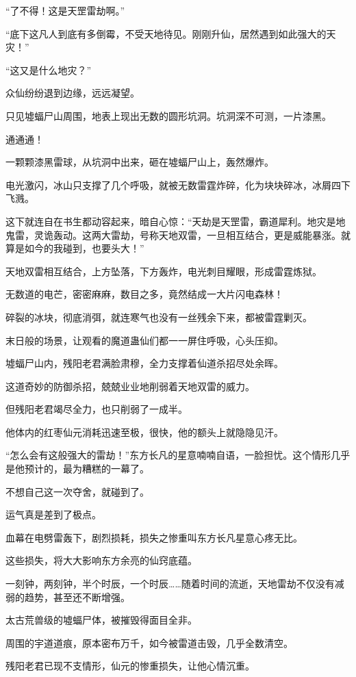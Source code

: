 \begin{this_body}
“了不得！这是天罡雷劫啊。”

“底下这凡人到底有多倒霉，不受天地待见。刚刚升仙，居然遇到如此强大的天灾！”

“这又是什么地灾？”

众仙纷纷退到边缘，远远凝望。

只见墟蝠尸山周围，地表上现出无数的圆形坑洞。坑洞深不可测，一片漆黑。

通通通！

一颗颗漆黑雷球，从坑洞中出来，砸在墟蝠尸山上，轰然爆炸。

电光激闪，冰山只支撑了几个呼吸，就被无数雷霆炸碎，化为块块碎冰，冰屑四下飞溅。

这下就连自在书生都动容起来，暗自心惊：“天劫是天罡雷，霸道犀利。地灾是地鬼雷，灵诡轰动。这两大雷劫，号称天地双雷，一旦相互结合，更是威能暴涨。就算是如今的我碰到，也要头大！”

天地双雷相互结合，上方坠落，下方轰炸，电光刺目耀眼，形成雷霆炼狱。

无数道的电芒，密密麻麻，数目之多，竟然结成一大片闪电森林！

碎裂的冰块，彻底消弭，就连寒气也没有一丝残余下来，都被雷霆剿灭。

末日般的场景，让观看的魔道蛊仙们都一一屏住呼吸，心头压抑。

墟蝠尸山内，残阳老君满脸肃穆，全力支撑着仙道杀招尽处余晖。

这道奇妙的防御杀招，兢兢业业地削弱着天地双雷的威力。

但残阳老君竭尽全力，也只削弱了一成半。

他体内的红枣仙元消耗迅速至极，很快，他的额头上就隐隐见汗。

“怎么会有这般强大的雷劫！”东方长凡的星意喃喃自语，一脸担忧。这个情形几乎是他预计的，最为糟糕的一幕了。

不想自己这一次夺舍，就碰到了。

运气真是差到了极点。

血幕在电劈雷轰下，剧烈损耗，损失之惨重叫东方长凡星意心疼无比。

这些损失，将大大影响东方余亮的仙窍底蕴。

一刻钟，两刻钟，半个时辰，一个时辰……随着时间的流逝，天地雷劫不仅没有减弱的趋势，甚至还不断增强。

太古荒兽级的墟蝠尸体，被摧毁得面目全非。

周围的宇道道痕，原本密布万千，如今被雷道击毁，几乎全数清空。

残阳老君已现不支情形，仙元的惨重损失，让他心情沉重。


\end{this_body}
